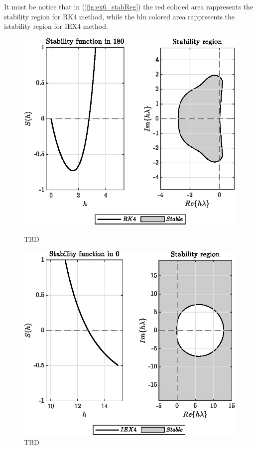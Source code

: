 \documentclass[11pt,a4paper,oneside]{article}
\begin{document}
It must be notice that in (\cref{fig:ex6_stabReg}) the red colored area rappresents the stability region for RK4 method, while the blu colored area rappresents the istability region for IEX4 method.
\begin{figure}[htb]
    \centering
    \begin{minipage}{0.45\textwidth}
        \centering
        \includegraphics*[width=\textwidth, keepaspectratio]{ex6_rk4.eps}
        \caption[]{\label{fig:ex6_rk4} TBD}
    \end{minipage}
    \hspace{0.05\textwidth}
    \begin{minipage}{0.45\textwidth}
        \centering
        \includegraphics*[width=\textwidth, keepaspectratio]{ex6_iex4.eps}
        \caption[]{\label{fig:ex6_iex4} TBD}
    \end{minipage}
\end{figure}
\end{document}
